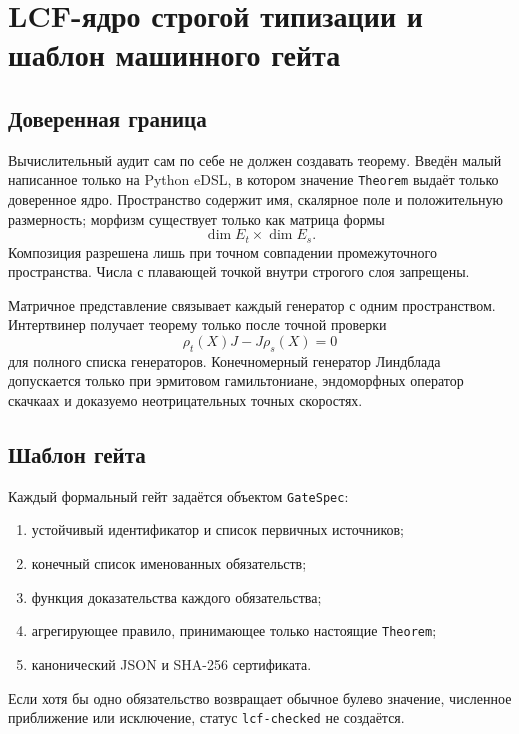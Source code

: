 \chapter{LCF-ядро строгой типизации и шаблон машинного гейта}
\label{ch:v8-lcf-proofdsl-architecture-gate}

\section{Доверенная граница}

Вычислительный аудит сам по себе не должен создавать теорему. Введён
малый написанное только на Python eDSL, в котором значение \texttt{Theorem} выдаёт только
доверенное ядро. Пространство содержит имя, скалярное поле и положительную
размерность; морфизм существует только как матрица формы
\begin{equation}
 \dim E_t\times\dim E_s.
 \label{eq:v8-proofdsl-morphism-shape}
\end{equation}
Композиция разрешена лишь при точном совпадении промежуточного пространства.
Числа с плавающей точкой внутри строгого слоя запрещены.

Матричное представление связывает каждый генератор с одним пространством.
Интертвинер получает теорему только после точной проверки
\begin{equation}
 \rho_t(X)J-J\rho_s(X)=0
 \label{eq:v8-proofdsl-intertwiner-rule}
\end{equation}
для полного списка генераторов. Конечномерный генератор Линдблада допускается
только при эрмитовом гамильтониане, эндоморфных оператор скачкаах и доказуемо
неотрицательных точных скоростях.

\section{Шаблон гейта}

Каждый формальный гейт задаётся объектом \texttt{GateSpec}:
\begin{enumerate}
 \item устойчивый идентификатор и список первичных источников;
 \item конечный список именованных обязательств;
 \item функция доказательства каждого обязательства;
 \item агрегирующее правило, принимающее только настоящие
       \texttt{Theorem};
 \item канонический JSON и SHA-256 сертификата.
\end{enumerate}
Если хотя бы одно обязательство возвращает обычное булево значение,
численное приближение или исключение, статус \texttt{lcf-checked} не
создаётся.

